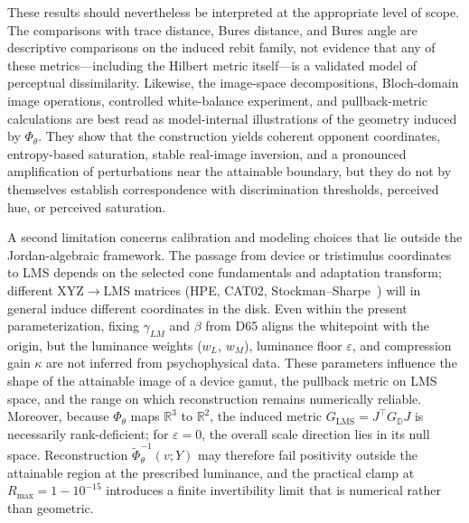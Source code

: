 \documentclass[11pt]{article}
\theoremstyle{plain}
\theoremstyle{definition}
\theoremstyle{remark}
\newcommand{\R}{\mathbb{R}}
\newcommand{\D}{\mathbb{D}}
\begin{document}
These results should nevertheless be interpreted at the appropriate level of scope. The comparisons with trace distance, Bures distance, and Bures angle are descriptive comparisons on the induced rebit family, not evidence that any of these metrics---including the Hilbert metric itself---is a validated model of perceptual dissimilarity. Likewise, the image-space decompositions, Bloch-domain image operations, controlled white-balance experiment, and pullback-metric calculations are best read as model-internal illustrations of the geometry induced by $\Phi_\theta$. They show that the construction yields coherent opponent coordinates, entropy-based saturation, stable real-image inversion, and a pronounced amplification of perturbations near the attainable boundary, but they do not by themselves establish correspondence with discrimination thresholds, perceived hue, or perceived saturation.

A second limitation concerns calibration and modeling choices that lie outside the Jordan-algebraic framework. The passage from device or tristimulus coordinates to LMS depends on the selected cone fundamentals and adaptation transform; different XYZ$\to$LMS matrices (HPE, CAT02, Stockman--Sharpe~\cite{StockmanSharpe2000}) will in general induce different coordinates in the disk. Even within the present parameterization, fixing $\gamma_{LM}$ and $\beta$ from D65 aligns the whitepoint with the origin, but the luminance weights ($w_L$, $w_M$), luminance floor $\varepsilon$, and compression gain $\kappa$ are not inferred from psychophysical data. These parameters influence the shape of the attainable image of a device gamut, the pullback metric on LMS space, and the range on which reconstruction remains numerically reliable. Moreover, because $\Phi_\theta$ maps $\R^3$ to $\R^2$, the induced metric $G_{\mathrm{LMS}} = J^\top G_\D J$ is necessarily rank-deficient; for $\varepsilon = 0$, the overall scale direction lies in its null space. Reconstruction $\widetilde{\Phi}_\theta^{-1}(v; Y)$ may therefore fail positivity outside the attainable region at the prescribed luminance, and the practical clamp at $R_{\max} = 1 - 10^{-15}$ introduces a finite invertibility limit that is numerical rather than geometric.
\end{document}
